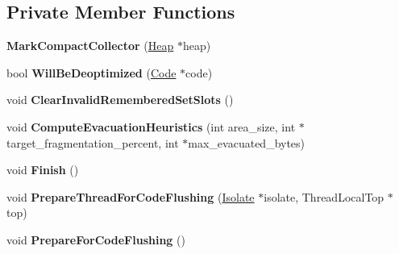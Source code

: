 \subsection*{Private Member Functions}
\begin{DoxyCompactItemize}
\item 
{\bfseries Mark\+Compact\+Collector} (\hyperlink{classv8_1_1internal_1_1_heap}{Heap} $\ast$heap)\hypertarget{classv8_1_1internal_1_1_mark_compact_collector_af7e1a054489f11045c46e33fd3c17c97}{}\label{classv8_1_1internal_1_1_mark_compact_collector_af7e1a054489f11045c46e33fd3c17c97}

\item 
bool {\bfseries Will\+Be\+Deoptimized} (\hyperlink{classv8_1_1internal_1_1_code}{Code} $\ast$code)\hypertarget{classv8_1_1internal_1_1_mark_compact_collector_ae0ee52cd920d7387fdeec7808c64ad42}{}\label{classv8_1_1internal_1_1_mark_compact_collector_ae0ee52cd920d7387fdeec7808c64ad42}

\item 
void {\bfseries Clear\+Invalid\+Remembered\+Set\+Slots} ()\hypertarget{classv8_1_1internal_1_1_mark_compact_collector_a156c1e3455997d97a2d06891062fcc65}{}\label{classv8_1_1internal_1_1_mark_compact_collector_a156c1e3455997d97a2d06891062fcc65}

\item 
void {\bfseries Compute\+Evacuation\+Heuristics} (int area\+\_\+size, int $\ast$target\+\_\+fragmentation\+\_\+percent, int $\ast$max\+\_\+evacuated\+\_\+bytes)\hypertarget{classv8_1_1internal_1_1_mark_compact_collector_a08ef354b2e41cbd4d0abe05f724439d9}{}\label{classv8_1_1internal_1_1_mark_compact_collector_a08ef354b2e41cbd4d0abe05f724439d9}

\item 
void {\bfseries Finish} ()\hypertarget{classv8_1_1internal_1_1_mark_compact_collector_aa1bd78a56ac02e2696341af641334a6b}{}\label{classv8_1_1internal_1_1_mark_compact_collector_aa1bd78a56ac02e2696341af641334a6b}

\item 
void {\bfseries Prepare\+Thread\+For\+Code\+Flushing} (\hyperlink{classv8_1_1internal_1_1_isolate}{Isolate} $\ast$isolate, Thread\+Local\+Top $\ast$top)\hypertarget{classv8_1_1internal_1_1_mark_compact_collector_a8600ad77d55af7d1df527733e553dc27}{}\label{classv8_1_1internal_1_1_mark_compact_collector_a8600ad77d55af7d1df527733e553dc27}

\item 
void {\bfseries Prepare\+For\+Code\+Flushing} ()\hypertarget{classv8_1_1internal_1_1_mark_compact_collector_a5516e8c0af3718327d0447a6567f3d55}{}\label{classv8_1_1internal_1_1_mark_compact_collector_a5516e8c0af3718327d0447a6567f3d55}


\end{DoxyCompactItemize}
